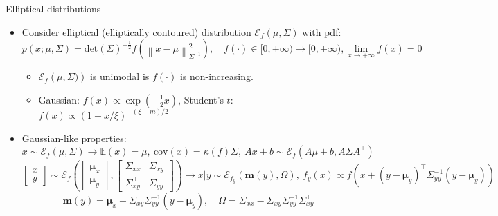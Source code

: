 \documentclass[smaller,aspectratio=169]{beamer}        %
\newcommand{\norm}[1]{\left\lVert#1\right\rVert}
\newcommand{\cov}[1]{\mathrm{cov}\left(#1\right)}
\newcommand{\dett}[1]{\mathrm{det}\left(#1\right)}
\newcommand{\ellip}[1]{\mathcal{E}_f\left(#1\right)}
\begin{document}
\begin{frame}{Elliptical distributions}
\begin{itemize}
    \item Consider elliptical (elliptically contoured) distribution $\ellip{\mu,\Sigma}$ with pdf:
    \[p(x;\mu,\Sigma)=\dett\Sigma^{-\frac{1}{2}}f\left(\norm{x-\mu}_{\Sigma^{-1}}^2\right),\quad f(\cdot)\in[0,+\infty)\to[0,+\infty),\lim_{x\to +\infty}f(x)=0\]

    \vspace{-0.5em}
    
    \begin{itemize}
        \item $\ellip{\mu,\Sigma)}$ is unimodal is $f(\cdot)$ is non-increasing.
        \item Gaussian: $f(x)\propto\exp\left(-\frac{1}{2}x\right)$, Student's $t$: $f(x)\propto\left(1+x/\xi\right)^{-(\xi+m)/2}$
    \end{itemize}

    \vspace{0.5em}

    \item Gaussian-like properties:
    \[x\sim\ellip{\mu,\Sigma}\rightarrow \mathbb{E}(x)=\mu,\ \cov{x}=\kappa(f)\Sigma,\ Ax+b\sim\ellip{A\mu+b,A\Sigma A^\top}\]
    \[
    \begin{bmatrix}x\\y\end{bmatrix}
    \sim \ellip{
    \begin{bmatrix}\boldsymbol{\mu}_x\\\boldsymbol{\mu}_y\end{bmatrix},
    \begin{bmatrix}
    \Sigma_{xx} & \Sigma_{xy}\\
    \Sigma_{xy}^\top & \Sigma_{yy}
    \end{bmatrix}}\rightarrow
    x|y\sim\mathcal{E}_{f_y}\left(
    \mathbf{m}(y),\Omega
    \right),\ f_y(x)\propto f\left(x+(y-\boldsymbol{\mu}_y)^\top\Sigma_{yy}^{-1}(y-\boldsymbol{\mu}_y)\right)
    \]
    \[\mathbf{m}(y)=\boldsymbol{\mu}_x+\Sigma_{xy}\Sigma_{yy}^{-1}\left(y-\boldsymbol{\mu}_y\right),\quad\Omega=\Sigma_{xx}-\Sigma_{xy}\Sigma_{yy}^{-1}\Sigma_{xy}^\top\]
\end{itemize}
\end{frame}
\end{document}
